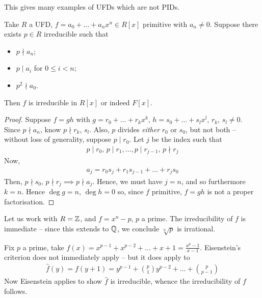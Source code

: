 \documentclass{../template/note}
\begin{document}
    \begin{remark*}
        This gives many examples of UFDs which are not PIDs.
    \end{remark*}
    

    \begin{theorem}
        Take $R$ a UFD, $f = a_0 + \dots + a_n x^n \in R[x]$ primitive with $a_n \neq 0$. Suppose there exists $p \in R$ irreducible such that
        \begin{itemize}
            \item $p \nmid a_n$;
            \item $p \mid a_i$ for $0 \leq i < n$;
            \item $p^2 \nmid a_0$.
        \end{itemize}
        Then $f$ is irreducible in $R[x]$ or indeed $F[x]$.        
    \end{theorem}

    \begin{proof}
        Suppose $f=gh$ with $g = r_0 + \dots + r_kx^k$, $h = s_0 + \dots + s_lx^l$, $r_k$, $s_l \neq 0$. Since $p \nmid a_n$, know $p \nmid r_k$, $s_l$. Also, $p$ divides \emph{either} $r_0$ or $s_0$, but not both -- without loss of generality, suppose $p \mid r_0$. Let $j$ be the index such that
        \begin{align*}
            p \mid r_0,\, p \mid r_1, \dots, p \mid r_{j-1},\, p \nmid r_j
        \end{align*}
        Now,
        \begin{align*}
            a_j = r_0s_j + r_1s_{j-1} + \dots + r_js_0
        \end{align*}
        Then, $p \nmid s_0$, $p \nmid r_j \implies p \nmid a_j$. Hence, we must have $j=n$, and so furthermore $k=n$. Hence $\deg g = n$, $\deg h = 0$ so, since $f$ primitive, $f=gh$ is not a proper factorisation.       
    \end{proof}
    
    \begin{example*}
        Let us work with $R=\mathbb Z$, and $f=x^n-p$, $p$ a prime. The irreducibility of $f$ is immediate -- since this extends to $\mathbb Q$, we conclude $\sqrt[n]{p}$ is irrational.
    \end{example*}
    
    \begin{example*}
        Fix $p$ a prime, take $f(x) = x^{p-1} + x^{p-2} + \dots + x + 1 = \frac{x^p-1}{x-1}$. Eisenstein's criterion does not immediately apply -- but it does apply to
        \begin{align*}
            \hat f(y) = f(y+1) = y^{p-1} + \binom p 1 y^{p-2} + \dots + \binom p {p-1}
        \end{align*}
        Now Eisenstein applies to show $\hat f$ is irreducible, whence the irreducibility of $f$ follows.
    \end{example*}
    
\end{document}
